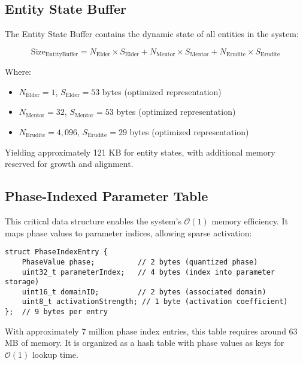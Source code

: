 \subsection{Entity State Buffer}

The Entity State Buffer contains the dynamic state of all entities in the system:

\begin{equation}
\text{Size}_{\text{EntityBuffer}} = N_{\text{Elder}} \times S_{\text{Elder}} + N_{\text{Mentor}} \times S_{\text{Mentor}} + N_{\text{Erudite}} \times S_{\text{Erudite}}
\end{equation}

Where:
\begin{itemize}
    \item $N_{\text{Elder}} = 1$, $S_{\text{Elder}} = 53$ bytes (optimized representation)
    \item $N_{\text{Mentor}} = 32$, $S_{\text{Mentor}} = 53$ bytes (optimized representation)
    \item $N_{\text{Erudite}} = 4,096$, $S_{\text{Erudite}} = 29$ bytes (optimized representation)
\end{itemize}

Yielding approximately 121 KB for entity states, with additional memory reserved for growth and alignment.

\subsection{Phase-Indexed Parameter Table}

This critical data structure enables the system's $\mathcal{O}(1)$ memory efficiency. It maps phase values to parameter indices, allowing sparse activation:

\begin{tcolorbox}[colback=LightGray, colframe=DarkGray, title=Phase-Indexed Parameter Table Structure, fonttitle=\bfseries]
\begin{verbatim}
struct PhaseIndexEntry {
    PhaseValue phase;          // 2 bytes (quantized phase)  
    uint32_t parameterIndex;   // 4 bytes (index into parameter storage)
    uint16_t domainID;         // 2 bytes (associated domain)
    uint8_t activationStrength; // 1 byte (activation coefficient)
};  // 9 bytes per entry
\end{verbatim}
\end{tcolorbox}

With approximately 7 million phase index entries, this table requires around 63 MB of memory. It is organized as a hash table with phase values as keys for $\mathcal{O}(1)$ lookup time.

